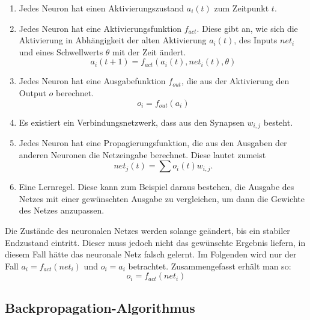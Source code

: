 \documentclass[12pt]{article}
\begin{document}
	\begin{enumerate}
		\item Jedes Neuron hat einen Aktivierungszustand $a_i(t)$ zum Zeitpunkt $t$.
		\item Jedes Neuron hat eine Aktivierungsfunktion $f_{act}$. Diese gibt an, wie sich die Aktivierung in Abhängigkeit der alten Aktivierung $a_i(t)$, des Inputs $net_i$ und eines Schwellwerts $\theta$ mit der Zeit ändert.
\begin{equation}a_i(t+1)=f_{act}(a_i(t),net_i(t),\theta)\end{equation}
		\item Jedes Neuron hat eine Ausgabefunktion $f_{out}$, die aus der Aktivierung den Output $o$ berechnet.
\begin{equation}o_i=f_{out}(a_i)\end{equation}
		\item Es existiert ein Verbindungsnetzwerk, dass aus den Synapsen $w_{i,j}$ besteht.
		\item Jedes Neuron hat eine Propagierungsfunktion, die aus den Ausgaben der anderen Neuronen die Netzeingabe berechnet. Diese lautet zumeist
\begin{equation}net_j(t)=\sum o_i(t)w_{i,j}.\end{equation}
		\item Eine Lernregel. Diese kann zum Beispiel daraus bestehen, die Ausgabe des Netzes mit einer gewünschten Ausgabe zu vergleichen, um dann die Gewichte des Netzes anzupassen.
	\end{enumerate}
Die Zustände des neuronalen Netzes werden solange geändert, bis ein stabiler Endzustand eintritt. Dieser muss jedoch nicht das gewünschte Ergebnis liefern, in diesem Fall hätte das neuronale Netz falsch gelernt.\cite{PDP}
Im Folgenden wird nur der Fall $a_i=f_{act}(net_i)$ und $o_i=a_i$ betrachtet. Zusammengefasst erhält man so:
	\begin{equation}
	o_i=f_{act}(net_i)	
	\end{equation}

\subsection{Backpropagation-Algorithmus}
\label{BP}
	
\end{document}
